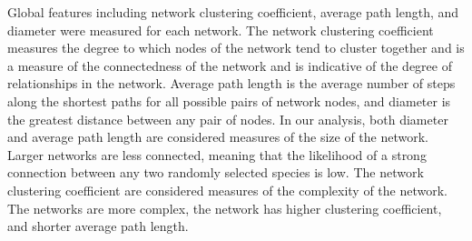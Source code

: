 Global features including network clustering coefficient, average path length, and diameter were measured for each network. The network clustering coefficient measures the degree to which nodes of the network tend to cluster together and is a measure of the connectedness of the network and is indicative of the degree of relationships in the network. Average path length is the average number of steps along the shortest paths for all possible pairs of network nodes, and diameter is the greatest distance between any pair of nodes. In our analysis, both diameter and average path length are considered measures of the size of the network. Larger networks are less connected, meaning that the likelihood of a strong connection between any two randomly selected species is low.
The network clustering coefficient are considered measures of the complexity of the network. The networks are more complex, the network has higher clustering coefficient, and shorter average path length.
\newpage